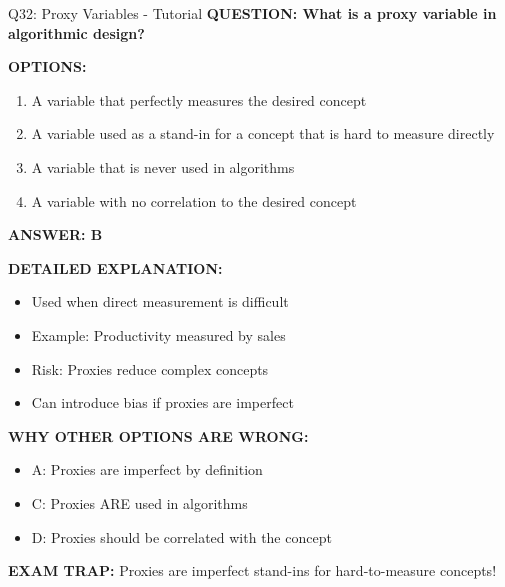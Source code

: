 \documentclass[8pt]{beamer}
\begin{document}
	\begin{frame}{Q32: Proxy Variables - Tutorial}
		\fontsize{6.5}{7.5}\selectfont
		\textbf{QUESTION: What is a proxy variable in algorithmic design?}
		
		\vspace{0.1cm}
		\textbf{OPTIONS:}
		\begin{enumerate}
			\item A variable that perfectly measures the desired concept
			\item A variable used as a stand-in for a concept that is hard to measure directly
			\item A variable that is never used in algorithms
			\item A variable with no correlation to the desired concept
		\end{enumerate}
		
		\vspace{0.1cm}
		\textcolor{myblue}{\textbf{ANSWER: B}}
		
		\vspace{0.1cm}
		\textbf{DETAILED EXPLANATION:}
		\begin{itemize}
			\item Used when direct measurement is difficult
			\item Example: Productivity measured by sales
			\item Risk: Proxies reduce complex concepts
			\item Can introduce bias if proxies are imperfect
		\end{itemize}
		
		\vspace{0.1cm}
		\textcolor{myred}{\textbf{WHY OTHER OPTIONS ARE WRONG:}}
		\begin{itemize}
			\item \textcolor{myred}{A:} Proxies are imperfect by definition
			\item \textcolor{myred}{C:} Proxies ARE used in algorithms
			\item \textcolor{myred}{D:} Proxies should be correlated with the concept
		\end{itemize}
		
		\textcolor{myred}{\textbf{EXAM TRAP:}} Proxies are \textcolor{myblue}{imperfect stand-ins} for hard-to-measure concepts!
	\end{frame}
	
\end{document}
